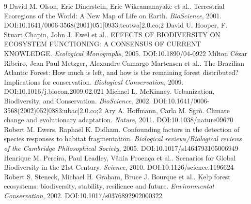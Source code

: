 \documentclass[11pt]{article}
\begin{document}
\begin{thebibliography}{9}
 David M. Olson, Eric Dinerstein, Eric Wikramanayake et al.. Terrestrial Ecoregions of the World: A New Map of Life on Earth. \emph{BioScience}, 2001. DOI:10.1641/0006-3568(2001)051[0933:teotwa]2.0.co;2
 David U. Hooper, F. Stuart Chapin, John J. Ewel et al.. EFFECTS OF BIODIVERSITY ON ECOSYSTEM FUNCTIONING: A CONSENSUS OF CURRENT KNOWLEDGE. \emph{Ecological Monographs}, 2005. DOI:10.1890/04-0922
 Milton Cézar Ribeiro, Jean Paul Metzger, Alexandre Camargo Martensen et al.. The Brazilian Atlantic Forest: How much is left, and how is the remaining forest distributed? Implications for conservation. \emph{Biological Conservation}, 2009. DOI:10.1016/j.biocon.2009.02.021
 Michael L. McKinney. Urbanization, Biodiversity, and Conservation. \emph{BioScience}, 2002. DOI:10.1641/0006-3568(2002)052[0883:ubac]2.0.co;2
 Ary A. Hoffmann, Carla M. Sgrò. Climate change and evolutionary adaptation. \emph{Nature}, 2011. DOI:10.1038/nature09670
 Robert M. Ewers, Raphaël K. Didham. Confounding factors in the detection of species responses to habitat fragmentation. \emph{Biological reviews/Biological reviews of the Cambridge Philosophical Society}, 2005. DOI:10.1017/s1464793105006949
 Henrique M. Pereira, Paul Leadley, Vânia Proença et al.. Scenarios for Global Biodiversity in the 21st Century. \emph{Science}, 2010. DOI:10.1126/science.1196624
 Robert S. Steneck, Michael H. Graham, Bruce J. Bourque et al.. Kelp forest ecosystems: biodiversity, stability, resilience and future. \emph{Environmental Conservation}, 2002. DOI:10.1017/s0376892902000322
\end{thebibliography}
\end{document}
